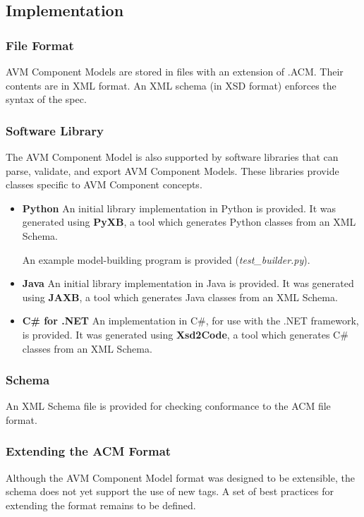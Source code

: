 \subsection{Implementation}
\subsubsection{File Format}
AVM Component Models are stored in files with an extension of .ACM. Their contents are in XML format. An XML schema (in XSD format) enforces the syntax of the spec.


\subsubsection{Software Library}
\label{ACMAPI}
The AVM Component Model is also supported by software libraries that can parse, validate, and export AVM Component Models. These libraries provide classes specific to AVM Component concepts.

\begin{itemize}
\item \textbf{Python}
An initial library implementation in Python is provided. It was generated using \textbf{PyXB}, a tool which generates Python classes from an XML Schema.

An example model-building program is provided (\textit{test\_builder.py}).

\item \textbf{Java}
An initial library implementation in Java is provided. It was generated using \textbf{JAXB}, a tool which generates Java classes from an XML Schema.

\item \textbf{C\# for .NET}
An implementation in C\#, for use with the .NET framework, is provided. It was generated using \textbf{Xsd2Code}, a tool which generates C\# classes from an XML Schema.

\end{itemize}

\subsubsection{Schema}
\label{ACMSchema}
An XML Schema file is provided for checking conformance to the ACM file format.

\subsubsection{Extending the ACM Format}
Although the AVM Component Model format was designed to be extensible, the schema does not yet support the use of new tags. A set of best practices for extending the format remains to be defined.

